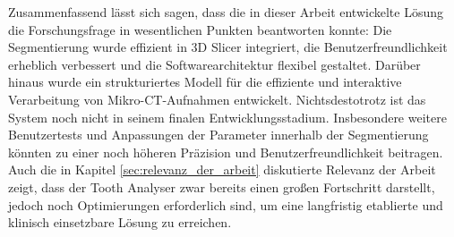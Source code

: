 Zusammenfassend lässt sich sagen, dass die in dieser Arbeit entwickelte Lösung die
Forschungsfrage in wesentlichen Punkten beantworten konnte: Die Segmentierung
wurde effizient in 3D Slicer integriert, die Benutzerfreundlichkeit erheblich verbessert
und die Softwarearchitektur flexibel gestaltet. Darüber hinaus wurde ein
strukturiertes Modell für die effiziente und interaktive Verarbeitung von Mikro-\ac{CT}-Aufnahmen
entwickelt. Nichtsdestotrotz ist das System noch nicht in seinem finalen
Entwicklungsstadium. Insbesondere weitere Benutzertests und Anpassungen der Parameter
innerhalb der Segmentierung könnten zu einer noch höheren Präzision und Benutzerfreundlichkeit
beitragen. Auch die in Kapitel \ref{sec:relevanz_der_arbeit} diskutierte
Relevanz der Arbeit zeigt, dass der Tooth Analyser zwar bereits einen großen Fortschritt
darstellt, jedoch noch Optimierungen erforderlich sind, um eine langfristig etablierte
und klinisch einsetzbare Lösung zu erreichen.
